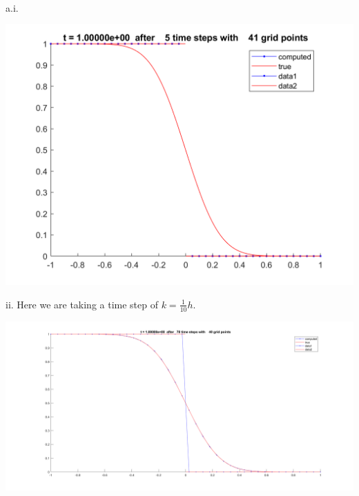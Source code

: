 \begin{solution}\renewcommand{\qedsymbol}{}\ \\
    a.i.
    \begin{center}
        \includegraphics[scale=0.3]{3a.PNG}
    \end{center}
        
    ii. Here we are taking a time step of $k=\frac{1}{10}h$.
    \begin{center}
        \includegraphics[scale=0.15]{3a2.PNG}
    \end{center}
        

\end{solution}
